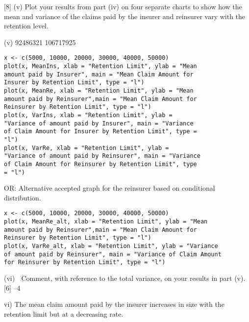 \documentclass[a4paper,12pt]{article}
\begin{document}
\newpage 


[8]
(v) Plot your results from part (iv) on four separate charts to show how the mean
and variance of the claims paid by the insurer and reinsurer vary with the
retention level.

(v)
92486321 106717925

\begin{framed}
\begin{verbatim}
x <- c(5000, 10000, 20000, 30000, 40000, 50000)
plot(x, MeanIns, xlab = "Retention Limit", ylab = "Mean
amount paid by Insurer", main = "Mean Claim Amount for
Insurer by Retention Limit", type = "l")
plot(x, MeanRe, xlab = "Retention Limit", ylab = "Mean
amount paid by Reinsurer",main = "Mean Claim Amount for
Reinsurer by Retention Limit", type = "l")
plot(x, VarIns, xlab = "Retention Limit", ylab =
"Variance of amount paid by Insurer", main = "Variance
of Claim Amount for Insurer by Retention Limit", type =
"l")
plot(x, VarRe, xlab = "Retention Limit", ylab =
"Variance of amount paid by Reinsurer", main = "Variance
of Claim Amount for Reinsurer by Retention Limit", type
= "l")

\end{verbatim}
\end{framed}


\newpage 

OR: Alternative accepted graph for the reinsurer based on conditional distribution.
\begin{framed}
\begin{verbatim}
x <- c(5000, 10000, 20000, 30000, 40000, 50000)
plot(x, MeanRe_alt, xlab = "Retention Limit", ylab = "Mean
amount paid by Reinsurer",main = "Mean Claim Amount for
Reinsurer by Retention Limit", type = "l")
plot(x, VarRe_alt, xlab = "Retention Limit", ylab = "Variance
of amount paid by Reinsurer", main = "Variance of Claim Amount
for Reinsurer by Retention Limit", type = "l")    
\end{verbatim}
\end{framed}







(vi)
 Comment, with reference to the total variance, on your results in part (v). [6]
–4

vi)
The mean claim amount paid by the insurer increases in size with the retention limit
but at a decreasing rate.
\end{document}
